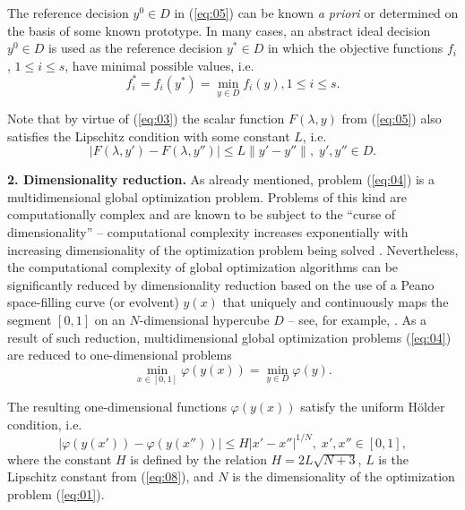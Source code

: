 \documentclass[runningheads]{llncs}
\begin{document}
The reference decision $y^0 \in D$ in (\ref{eq:05}) can be known \textit{a priori} or determined on the basis of some known prototype. In many cases, an abstract ideal decision $y^0 \in D$ is used as the reference decision $y^*\in D$ in which the objective functions $f_i$, $1 \leq i \leq s$, have minimal possible values, i.e.
\begin{equation}
\label{eq:07}
f_i^* =f_i (y^*)=\min_{y \in D} f_i (y), 1 \leq i \leq s.
\end{equation}

Note that by virtue of (\ref{eq:03}) the scalar function $F(\lambda,y)$ from (\ref{eq:05}) also satisfies the Lipschitz condition with some constant $L$, i.e.
\begin{equation}
\label{eq:08}
|F(\lambda, y') - F(\lambda, y'')| \leq L\|y' - y''\|, \; y',y''\in D.
\end{equation}

\textbf{2. Dimensionality reduction.} As already mentioned, problem (\ref{eq:04}) is a multidimensional global optimization problem. Problems of this kind are computationally complex and are known to be subject to the ``curse of dimensionality'' -- computational complexity increases exponentially with increasing dimensionality of the optimization problem being solved \cite{c13,c14,c15,c16,c17,c18,c19,c20}. Nevertheless, the computational complexity of global optimization algorithms can be significantly reduced by dimensionality reduction based on the use of a Peano space-filling curve (or evolvent) $y(x)$ that uniquely and continuously maps the segment $[0,1]$ on an $N$-dimensional hypercube $D$ -- see, for example, \cite{c15,c21}. As a result of such reduction, multidimensional global optimization problems (\ref{eq:04}) are reduced to one-dimensional problems
\begin{equation}
\label{eq:09}
\min_{x \in [0,1]} \varphi (y(x))= \min_{y \in D} \varphi(y).
\end{equation}

The resulting one-dimensional functions $\varphi(y(x))$ satisfy the uniform H{\" o}lder condition, i.e.
\begin{equation}
\label{eq:10}
|\varphi (y(x'))- \varphi (y(x''))| \leq H |x'-x''|^{1/N}, \; x',x''\in[0,1],
\end{equation}
where the constant $H$ is defined by the relation $H=2L\sqrt{N+3}$, $L$ is the Lipschitz constant from (\ref{eq:08}), and $N$ is the dimensionality of the optimization problem (\ref{eq:01}). 
\end{document}
